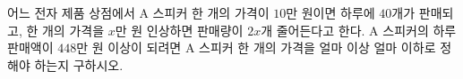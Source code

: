 어느 전자 제품 상점에서 $\mathrm{A}$ 스피커 한 개의 가격이 $10$만 원이면 하루에 $40$개가 판매되고, 한 개의 가격을 $x$만 원 인상하면 판매량이 $2x$개 줄어든다고 한다. $\mathrm{A}$ 스피커의 하루 판매액이 $448$만 원 이상이 되려면 $\mathrm{A}$ 스피커 한 개의 가격을 얼마 이상 얼마 이하로 정해야 하는지 구하시오.
